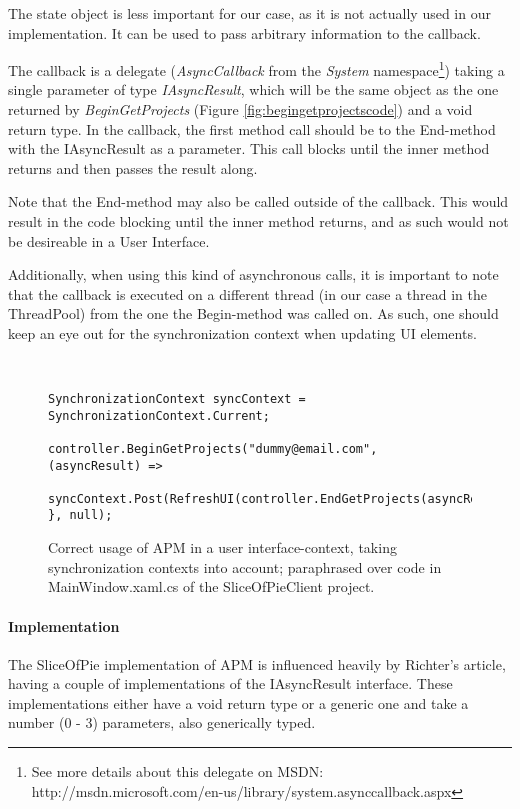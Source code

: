 The state object is less important for our case, as it is not actually used in our implementation. It can be used
to pass arbitrary information to the callback.

The callback is a delegate (\emph{AsyncCallback} from the \emph{System} namespace\footnote{See more details about this delegate on MSDN: http://msdn.microsoft.com/en-us/library/system.asynccallback.aspx})
taking a single parameter of type \emph{IAsyncResult}, which will be the same object as the one
returned by \emph{BeginGetProjects} (Figure \ref{fig:begingetprojectscode}) and a void return type.
In the callback, the first method call should be to the End-method with the IAsyncResult
as a parameter. This call blocks until the inner method returns and then passes the result along.

Note that the End-method may also be called outside of the callback. This would result in the code
blocking until the inner method returns, and as such would not be desireable in a User Interface.

Additionally, when using this kind of asynchronous calls, it is important to note that the callback
is executed on a different thread (in our case a thread in the ThreadPool) from the one the Begin-method
was called on. As such, one should keep an eye out for the synchronization context when updating UI
elements.\cite[p.~622]{Griffiths2010}

\begin{figure}[hbt]
    \begin{verbatim}
    
    
SynchronizationContext syncContext = SynchronizationContext.Current;

controller.BeginGetProjects("dummy@email.com", (asyncResult) =>
    syncContext.Post(RefreshUI(controller.EndGetProjects(asyncResult)))
}, null);\end{verbatim}
    \caption{Correct usage of APM in a user interface-context, taking synchronization contexts into account; paraphrased over code in MainWindow.xaml.cs of the SliceOfPieClient project.}
    \label{fig:apmuserinterfacecode}
\end{figure}

\paragraph{Implementation}

The SliceOfPie implementation of APM is influenced heavily by Richter's article, having a couple of
implementations of the IAsyncResult interface. These implementations either have a void return type
or a generic one and take a number (0 - 3) parameters, also generically typed.

